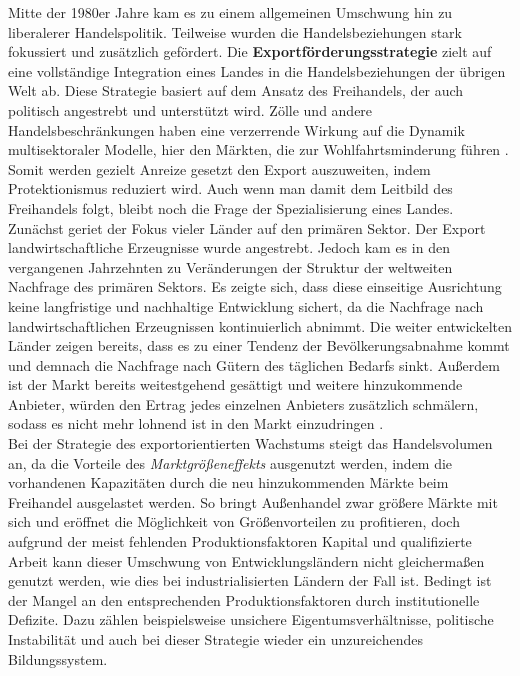 Mitte der 1980er Jahre kam es zu einem allgemeinen Umschwung hin zu liberalerer Handelspolitik. Teilweise wurden die Handelsbeziehungen stark fokussiert und zus{\"a}tzlich gef{\"o}rdert. Die \textbf{Exportf{\"o}rderungsstrategie} zielt auf eine vollst{\"a}ndige Integration eines Landes in die Handelsbeziehungen der {\"u}brigen Welt ab. Diese Strategie basiert auf dem Ansatz des Freihandels, der auch politisch angestrebt und unterst{\"u}tzt wird. Z{\"o}lle und andere Handelsbeschr{\"a}nkungen haben eine verzerrende Wirkung auf die Dynamik multisektoraler Modelle, hier den M{\"a}rkten, die zur Wohlfahrtsminderung f{\"u}hren \cite{Ortigueira.2002}. Somit werden gezielt Anreize gesetzt den Export auszuweiten, indem Protektionismus reduziert wird. Auch wenn man damit dem Leitbild des Freihandels folgt, bleibt noch die Frage der Spezialisierung eines Landes. 
Zun{\"a}chst geriet der Fokus vieler L{\"a}nder auf den prim{\"a}ren Sektor. Der Export landwirtschaftliche Erzeugnisse wurde angestrebt. Jedoch kam es in den vergangenen Jahrzehnten zu Ver{\"a}nderungen der Struktur der weltweiten Nachfrage des prim{\"a}ren Sektors. Es zeigte sich, dass diese einseitige Ausrichtung keine langfristige und nachhaltige Entwicklung sichert, da die Nachfrage nach landwirtschaftlichen Erzeugnissen  kontinuierlich abnimmt. Die weiter entwickelten L{\"a}nder zeigen bereits, dass es zu einer Tendenz der Bev{\"o}lkerungsabnahme kommt und demnach die Nachfrage nach G{\"u}tern des t{\"a}glichen Bedarfs sinkt. Au{\ss}erdem ist der Markt bereits weitestgehend ges{\"a}ttigt und weitere hinzukommende Anbieter, w{\"u}rden den Ertrag jedes einzelnen Anbieters zus{\"a}tzlich schm{\"a}lern, sodass es nicht mehr lohnend ist in den Markt einzudringen \citep{Muller.2005,Lachmann.1994}.\\
Bei der Strategie des exportorientierten Wachstums steigt das Handelsvolumen an, da die Vorteile des \textit{Marktgr{\"o}{\ss}eneffekts} ausgenutzt werden, indem die vorhandenen Kapazit{\"a}ten durch die neu hinzukommenden M{\"a}rkte beim Freihandel ausgelastet werden. 
So bringt Au{\ss}enhandel zwar gr{\"o}{\ss}ere M{\"a}rkte mit sich und er{\"o}ffnet die M{\"o}glichkeit von Gr{\"o}{\ss}envorteilen zu profitieren, doch aufgrund der meist fehlenden Produktionsfaktoren Kapital und qualifizierte Arbeit kann dieser Umschwung von Entwicklungsl{\"a}ndern nicht gleicherma{\ss}en genutzt werden, wie dies bei industrialisierten L{\"a}ndern der Fall ist. Bedingt ist der Mangel an den entsprechenden Produktionsfaktoren durch institutionelle Defizite. Dazu z{\"a}hlen beispielsweise unsichere Eigentumsverh{\"a}ltnisse, politische Instabilit{\"a}t und auch bei dieser Strategie wieder ein unzureichendes Bildungssystem.\\
